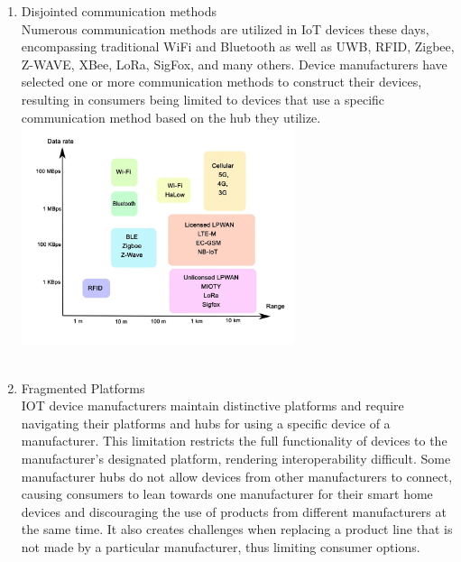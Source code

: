 \documentclass[11pt, conference]{IEEEtran}
\begin{document}
\begin{enumerate}[label=\alph*]
        \item Disjointed communication methods\\
        Numerous communication methods are utilized in IoT devices these days, encompassing traditional WiFi and Bluetooth as well as UWB, RFID, Zigbee, Z-WAVE, XBee, LoRa, SigFox, and many others. Device manufacturers have selected one or more communication methods to construct their devices, resulting in consumers being limited to devices that use a specific communication method based on the hub they utilize.\\
        
        \includegraphics[width=8cm]{imgs/iot-protocols-1.png}\\\\
        
        \item Fragmented Platforms\\
        IOT device manufacturers maintain distinctive platforms and require navigating their platforms and hubs for using a specific device of a manufacturer. This limitation restricts the full functionality of devices to the manufacturer's designated platform, rendering interoperability difficult. Some manufacturer hubs do not allow devices from other manufacturers to connect, causing consumers to lean towards one manufacturer for their smart home devices and discouraging the use of products from different manufacturers at the same time. It also creates challenges when replacing a product line that is not made by a particular manufacturer, thus limiting consumer options.\\
        
    \end{enumerate}
\end{document}
